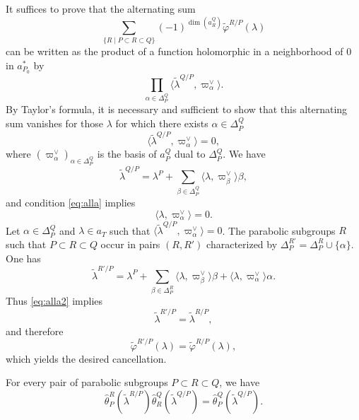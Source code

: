 \begin{paragr}
\begin{preuve}
It suffices to prove that the alternating sum  
$$\sum_{\{R\mid P\subset R\subset Q\}} (-1)^{\dim(a_R^Q)} \tilde{\varphi}^{R/P}(\lambda)$$
can be written as the product of a function holomorphic in a neighborhood of $0$ in $a_{P_0}^*$ by 
$$\prod_{\alpha\in \Delta_P^Q} \langle \tilde{\lambda}^{Q/P}, \varpi_\alpha^\vee \rangle.$$
By Taylor's formula, it is necessary and sufficient to show that this alternating sum vanishes for those $\lambda$ for which there exists $\alpha\in \Delta_P^Q$
\begin{equation}
  \label{eq:alla}
  \langle \tilde{\lambda}^{Q/P}, \varpi_\alpha^\vee \rangle=0,
\end{equation}
where $(\varpi_\alpha^\vee)_{\alpha\in \Delta_P^Q}$ is the basis of $a_P^Q$ dual to $\Delta_P^Q$. We have 
$$ \tilde{\lambda}^{Q/P}=\lambda^P+\sum_{\beta\in \Delta_P^Q} \langle \lambda , \varpi_\beta^\vee \rangle \beta,$$
and condition \eqref{eq:alla} implies 
\begin{equation}
  \label{eq:alla2}
  \langle \lambda, \varpi_\alpha^\vee \rangle=0.
\end{equation}
Let $\alpha\in \Delta_P^Q$ and $\lambda\in a_T$ such that  $\langle \tilde{\lambda}^{Q/P}, \varpi_\alpha^\vee \rangle=0$. The parabolic subgroups $R$ such that $P\subset R\subset Q$ occur in pairs $(R,R')$ characterized by $\Delta_P^{R'}= \Delta_P^{R}\cup \{\alpha\}$. One has 
$$\tilde{\lambda}^{R'/P}=\lambda^P+\sum_{\beta\in \Delta_P^R} \langle \lambda , \varpi_\beta^\vee \rangle \beta+ \langle \lambda , \varpi_\alpha^\vee \rangle \alpha.$$
Thus \eqref{eq:alla2} implies 
$$ \tilde{\lambda}^{R'/P}=\tilde{\lambda}^{R/P},$$
and therefore 
$$ \tilde{\varphi}^{R'/P}(\lambda)= \tilde{\varphi}^{R/P}(\lambda),$$
which yields the desired cancellation.
\end{preuve}

\begin{lemme}\label{lem:egalite}
 For every pair of parabolic subgroups $P\subset R\subset Q$, we have 
$$\hat{\theta}_P^R(\tilde{\lambda}^{R/P}) \hat{\theta}_R^Q(\tilde{\lambda}^{Q/P})=\hat{\theta}_P^Q(\tilde{\lambda}^{Q/P}).$$
\end{lemme}


\end{paragr}
